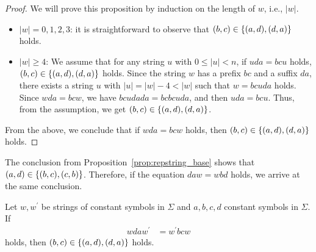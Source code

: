 \begin{proof}
  We will prove this proposition by induction on the length of $w$, i.e., $|w|$.
  \begin{itemize}
  \item $|w| = 0,1,2,3$: it is straightforward to observe that $(b,c) \in \{(a,d), (d,a)\}$ holds.
  \item $|w| \ge 4$: We assume that for any string $u$ with $0\leq |u| < n$, if $uda = bcu$ holds, $(b,c) \in \{(a,d), (d,a)\}$ holds. Since the string $w$ has a prefix $bc$ and a suffix $da$, there exists a string $u$ with $|u| = |w| - 4 < |w|$ such that $w = bcuda$ holds. Since $wda = bcw$, we have $bcudada = bcbcuda$, and then $uda = bcu$. Thus, from the assumption, we get $(b,c) \in \{(a,d), (d,a)\}$.
  \end{itemize}
From the above, we conclude that if $wda = bcw$ holds, then $(b,c) \in \{(a,d), (d,a)\}$ holds.
\end{proof}

The conclusion from Proposition~\ref{prop:repstring_base} shows that $(a,d) \in \{(b,c), (c,b)\}$. Therefore, if the equation $daw = wbd$ holds, we arrive at the same conclusion.

\begin{prop}\label{prop:repstring}
Let $w,w^{\prime}$ be strings of constant symbols in $\Sigma$ and $a,b,c,d$ constant symbols in $\Sigma$.
If
\begin{align}
  wdaw^{\prime} & = w^{\prime}bcw \label{eq:repstring}
\end{align}
holds, then $(b,c) \in \{(a,d), (d,a)\}$ holds.\label{prop:repstring_eq}
\end{prop}

